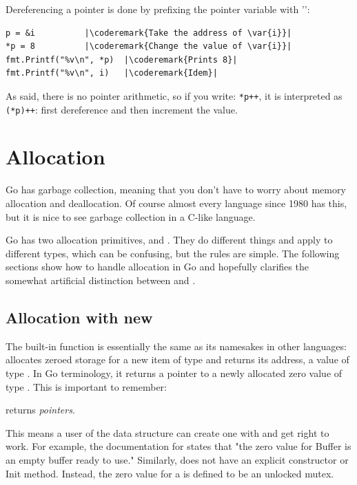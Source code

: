 Dereferencing a pointer is done by prefixing the pointer variable with
'\type{*}':
\begin{lstlisting}[caption=Dereferencing a pointer,label=src:deref]
p = &i			|\coderemark{Take the address of \var{i}}|
*p = 8			|\coderemark{Change the value of \var{i}}|
fmt.Printf("%v\n", *p)  |\coderemark{Prints 8}|
fmt.Printf("%v\n", i)	|\coderemark{Idem}|
\end{lstlisting}

As said, there is no pointer arithmetic, so if you write:
\lstinline{*p++}, it is interpreted as \lstinline{(*p)++}: first
dereference and then increment the value.


\section{Allocation}
Go has garbage collection, meaning that you don't have to worry about
memory allocation and deallocation. Of course almost every language
since 1980 has this, but it is nice to see garbage collection in a
C-like language.

Go has two allocation primitives,  and . They do different
things and apply to different types, which can be confusing, but the
rules are simple.
The following sections show how to handle allocation
in Go and hopefully clarifies the somewhat artificial distinction between
 and . 

\subsection{Allocation with new}
\label{sec:allocation with new}
The built-in function  is 
essentially the same as its namesakes in other languages: 
allocates zeroed storage for a new item of type  and returns its
address, a value of type . In Go terminology, it returns a pointer to
a newly allocated zero value of type . This is important to
remember:
\begin{lbar}[]
 returns \emph{pointers}.
\end{lbar}

This
means a user of the data structure can create one with  and get
right to work. For example, the documentation for  states
that "the zero value for Buffer is an empty buffer ready to use."
Similarly,  does not have an explicit constructor or Init
method. Instead, the zero value for a  is defined to be an
unlocked mutex.

